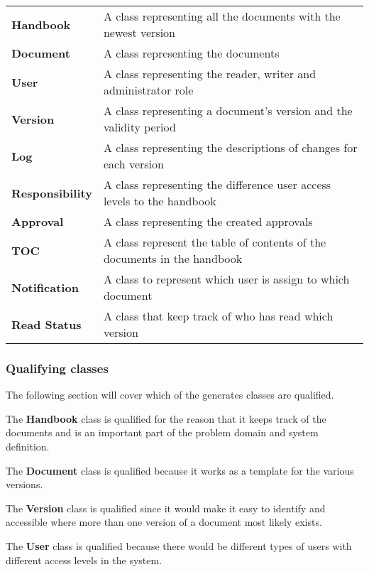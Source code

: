 \begin{tabular}{l l}

  \textbf{Handbook} & A class representing all the documents with the newest version\\
  \textbf{Document} & A class representing the documents\\ %
  \textbf{User }& A class representing the reader, writer and administrator role\\
 \textbf{Version} & A class representing a document’s version and the validity period\\
  \textbf{Log} & A class representing the descriptions of changes for each version\\
  \textbf{Responsibility} & A class representing the difference user access levels to the handbook\\
 \textbf{Approval} & A class representing the created approvals\\  %
  \textbf{TOC} & A class represent the table of contents of the documents in the handbook\\
  \textbf{Notification} & A class to represent which user is assign to which document\\
  \textbf{Read Status} & A class that keep track of who has read which version

\end{tabular}


\subsubsection{Qualifying classes}
The following section will cover which of the generates classes are qualified.


The \textbf{Handbook} class is qualified for the reason that it keeps track of the documents and is an important part of the problem domain and system definition. 

The\textbf{ Document} class is qualified because it works as a template for the various versions. 

The \textbf{Version} class is qualified since it would make it easy to identify and accessible where more than one version of a document most likely exists.

The \textbf{User} class is qualified because there would be different types of users with different access levels in the system. 

